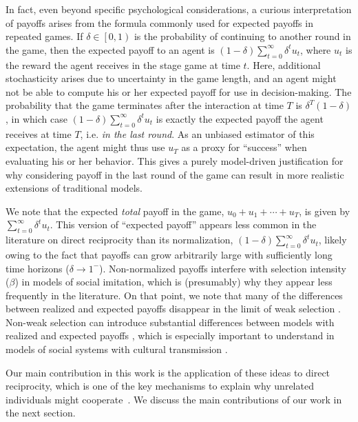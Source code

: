 \documentclass[11pt]{article}
\theoremstyle{plainCl1}
\theoremstyle{plainCl2}
\begin{document}
In fact, even beyond specific psychological considerations, a curious interpretation of payoffs arises from the formula commonly used for expected payoffs in repeated games. If $\delta\in\left[0,1\right)$ is the probability of continuing to another round in the game, then the expected payoff to an agent is $\left(1-\delta\right)\sum_{t=0}^{\infty}\delta^{t}u_{t}$, where $u_{t}$ is the reward the agent receives in the stage game at time $t$. Here, additional stochasticity arises due to uncertainty in the game length, and an agent might not be able to compute his or her expected payoff for use in decision-making. The probability that the game terminates after the interaction at time $T$ is $\delta^{T}\left(1-\delta\right)$, in which case $\left(1-\delta\right)\sum_{t=0}^{\infty}\delta^{t}u_{t}$ is exactly the expected payoff the agent receives at time $T$, i.e. \emph{in the last round}. As an unbiased estimator of this expectation, the agent might thus use $u_{T}$ as a proxy for ``success'' when evaluating his or her behavior. This gives a purely model-driven justification for why considering payoff in the last round of the game can result in more realistic extensions of traditional models.

We note that the expected \emph{total} payoff in the game, $u_{0}+u_{1}+\cdots +u_{T}$, is given by $\sum_{t=0}^{\infty}\delta^{t}u_{t}$. This version of ``expected payoff'' appears less common in the literature on direct reciprocity than its normalization, $\left(1-\delta\right)\sum_{t=0}^{\infty}\delta^{t}u_{t}$, likely owing to the fact that payoffs can grow arbitrarily large with sufficiently long time horizons ($\delta\rightarrow 1^{-}$). Non-normalized payoffs interfere with selection intensity ($\beta$) in models of social imitation, which is (presumably) why they appear less frequently in the literature. On that point, we note that many of the differences between realized and expected payoffs disappear in the limit of weak selection \citep{mcavoy:NHB:2020}. Non-weak selection can introduce substantial differences between models with realized and expected payoffs \citep{mcavoy:PLOSCB:2021}, which is especially important to understand in models of social systems with cultural transmission \citep{cavalli1981cultural}.

Our main contribution in this work is the application of these ideas to direct reciprocity, which is one of the key mechanisms to explain why unrelated individuals might cooperate~\citep{nowak:Science:2006}. We discuss the main contributions of our work in the next section.
\end{document}
